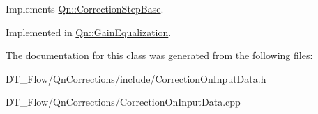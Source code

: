 Implements \mbox{\hyperlink{classQn_1_1CorrectionStepBase_a235ae6623fbbe26601b95f7e76753bfd}{Qn\+::\+Correction\+Step\+Base}}.



Implemented in \mbox{\hyperlink{classQn_1_1GainEqualization_af444038af10eb53d8bd6c8703d4e5629}{Qn\+::\+Gain\+Equalization}}.



The documentation for this class was generated from the following files\+:\begin{DoxyCompactItemize}
\item 
D\+T\+\_\+\+Flow/\+Qn\+Corrections/include/Correction\+On\+Input\+Data.\+h\item 
D\+T\+\_\+\+Flow/\+Qn\+Corrections/Correction\+On\+Input\+Data.\+cpp\end{DoxyCompactItemize}
